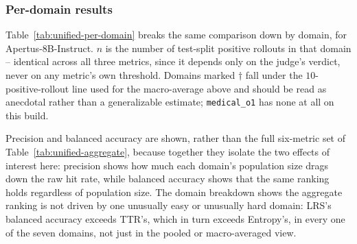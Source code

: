 \documentclass{article}
\begin{document}
\subsubsection{Per-domain results}

Table~\ref{tab:unified-per-domain} breaks the same comparison down by
domain, for Apertus-8B-Instruct. $n$ is the number of test-split positive
rollouts in that domain -- identical across all three metrics, since it
depends only on the judge's verdict, never on any metric's own threshold.
Domains marked $\dagger$ fall under the $10$-positive-rollout line used for
the macro-average above and should be read as anecdotal rather than a
generalizable estimate; \texttt{medical\_o1} has none at all on this build.

\begin{table}[h]
\centering
{}
\caption{Per-domain precision and balanced accuracy, Apertus-8B-Instruct,
test split. $^\dagger$: fewer than $10$ positive test rollouts, excluded
from Table~\ref{tab:unified-aggregate}'s macro-average.}
\label{tab:unified-per-domain}
\end{table}

Precision and balanced accuracy are shown, rather than the full six-metric
set of Table~\ref{tab:unified-aggregate}, because together they isolate the
two effects of interest here: precision shows how much each domain's
population size drags down the raw hit rate, while balanced accuracy shows
that the same ranking holds regardless of population size. The domain breakdown shows the aggregate ranking is not driven by one
unusually easy or unusually hard domain: LRS's balanced accuracy exceeds
TTR's, which in turn exceeds Entropy's, in every one of the seven domains,
not just in the pooled or macro-averaged view.
\end{document}
